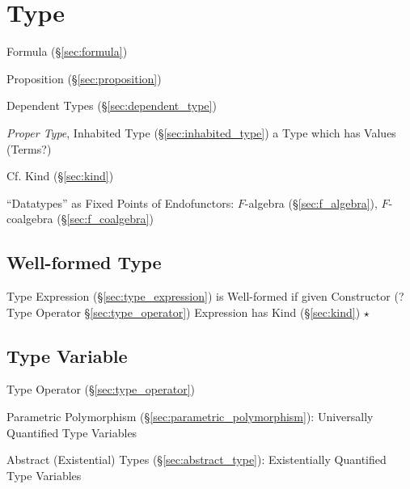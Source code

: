 \section{Type}\label{sec:type}

Formula (\S\ref{sec:formula})

Proposition (\S\ref{sec:proposition})


Dependent Types (\S\ref{sec:dependent_type})

\emph{Proper Type}, Inhabited Type (\S\ref{sec:inhabited_type}) a Type
which has Values (Terms?)

\fist Cf. Kind (\S\ref{sec:kind})


``Datatypes'' as Fixed Points of Endofunctors: $F$-algebra
(\S\ref{sec:f_algebra}), $F$-coalgebra (\S\ref{sec:f_coalgebra})



\subsection{Well-formed Type}\label{sec:wellformed_type}


Type Expression (\S\ref{sec:type_expression}) is Well-formed if given
Constructor (? Type Operator \S\ref{sec:type_operator}) Expression has
Kind (\S\ref{sec:kind}) $\star$



\subsection{Type Variable}\label{sec:type_variable}

Type Operator (\S\ref{sec:type_operator})

Parametric Polymorphism (\S\ref{sec:parametric_polymorphism}):
Universally Quantified Type Variables

Abstract (Existential) Types (\S\ref{sec:abstract_type}):
Existentially Quantified Type Variables




